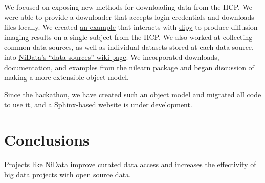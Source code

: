 \documentclass[twocolumn]{bmcart}%
\begin{document}
We focused on exposing new methods for downloading data from the HCP. We
were able to provide a downloader that accepts login credentials and
downloads files locally. We created
\href{https://github.com/arokem/nidata/blob/bcipolli-ohbm2015-ipynb/ipynb/hcp-fetcher-dwi.ipynb}{an
example} that interacts with \href{https://github.com/nipy/dipy}{dipy}
to produce diffusion imaging results on a single subject from the HCP.
We also worked at collecting common data sources, as well as individual
datasets stored at each data source, into
\href{https://github.com/nidata/nidata/wiki/Data-sources}{NiData's
``data sources'' wiki page}. We incorporated downloads, documentation,
and examples from the \href{http://github.com/nilearn/nilearn}{nilearn}
package and began discussion of making a more extensible object model.

Since the hackathon, we have created such an object model and migrated
all code to use it, and a Sphinx-based website is under development.

\section{Conclusions}\label{conclusions}

Projects like NiData improve curated data access and increases the
effectivity of big data projects with open source data.

\end{document}
